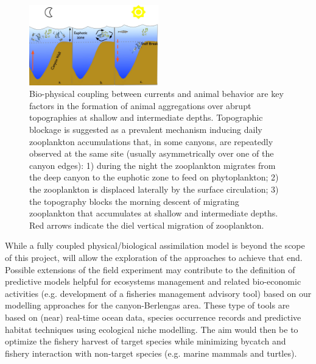 \begin{figure}
  \vspace{-0.5cm}
  \centering
  \includegraphics[width=0.5\textwidth]{fig/plankton-canyon.jpg}
  \caption{Bio-physical coupling between currents and animal behavior
    are key factors in the formation of animal aggregations over
    abrupt topographies at shallow and intermediate
    depths. Topographic blockage is suggested as a prevalent mechanism
    inducing daily zooplankton accumulations that, in some canyons,
    are repeatedly observed at the same site (usually asymmetrically
    over one of the canyon edges): 1) during the night the zooplankton
    migrates from the deep canyon to the euphotic zone to feed on
    phytoplankton; 2) the zooplankton is displaced laterally by the
    surface circulation; 3) the topography blocks the morning descent
    of migrating zooplankton that accumulates at shallow and
    intermediate depths.  Red arrows indicate the diel vertical
    migration of zooplankton.}
  \label{fig:plankton}
\end{figure}

While a fully coupled physical/biological assimilation model is beyond
the scope of this project, \proj will allow the exploration of the
approaches to achieve that end.  Possible extensions of the field
experiment may contribute to the definition of predictive models
helpful for ecosystems management and related bio-economic activities
(e.g. development of a fisheries management advisory tool) based on
our modelling approaches for the \naz canyon-Berlengas area. These
type of tools are based on (near) real-time ocean data, species
occurrence records and predictive habitat techniques using ecological
niche modelling. The aim would then be to optimize the fishery harvest
of target species while minimizing bycatch and fishery interaction
with non-target species (e.g. marine mammals and turtles).


